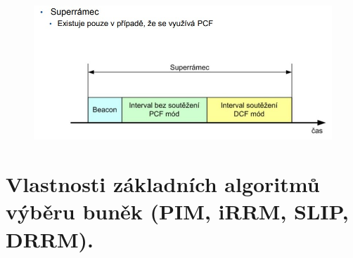 \begin{figure}[ht]
\centering
  \begin{center}
    \includegraphics[scale=0.7]{BPC-HWS/images/superramec.jpg}
  \end{center}
\end{figure}


\newpage
\section{Vlastnosti základních algoritmů výběru buněk (PIM, iRRM, SLIP, DRRM).}
